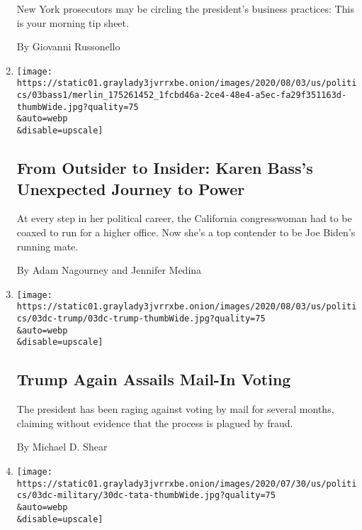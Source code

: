 \begin{enumerate}
  New York prosecutors may be circling the president's business
  practices: This is your morning tip sheet.

  By Giovanni Russonello
\item
  \href{/2020/08/04/us/politics/karen-bass-vice-president-biden.html}{}

  \texttt{[image: https://static01.graylady3jvrrxbe.onion/images/2020/08/03/us/politics/03bass1/merlin\_175261452\_1fcbd46a-2ce4-48e4-a5ec-fa29f351163d-thumbWide.jpg?quality=75\\\&auto=webp\\\&disable=upscale]}

  \hypertarget{from-outsider-to-insider-karen-basss-unexpected-journey-to-power}{%
  \subsection{From Outsider to Insider: Karen Bass's Unexpected Journey
  to
  Power}\label{from-outsider-to-insider-karen-basss-unexpected-journey-to-power}}

  At every step in her political career, the California congresswoman
  had to be coaxed to run for a higher office. Now she's a top contender
  to be Joe Biden's running mate.

  By Adam Nagourney and Jennifer Medina
\item
  \href{/2020/08/03/us/politics/trump-mail-in-voting.html}{}

  \texttt{[image: https://static01.graylady3jvrrxbe.onion/images/2020/08/03/us/politics/03dc-trump/03dc-trump-thumbWide.jpg?quality=75\\\&auto=webp\\\&disable=upscale]}

  \hypertarget{trump-again-assails-mail-in-voting}{%
  \subsection{Trump Again Assails Mail-In
  Voting}\label{trump-again-assails-mail-in-voting}}

  The president has been raging against voting by mail for several
  months, claiming without evidence that the process is plagued by
  fraud.

  By Michael D. Shear
\item
  \href{/2020/08/03/us/politics/tata-pentagon.html}{}

  \texttt{[image: https://static01.graylady3jvrrxbe.onion/images/2020/07/30/us/politics/03dc-military/30dc-tata-thumbWide.jpg?quality=75\\\&auto=webp\\\&disable=upscale]}

  \hypertarget{trump-puts-pentagon-in-political-crossfire-with-tata-appointment}{%
}
\end{enumerate}
